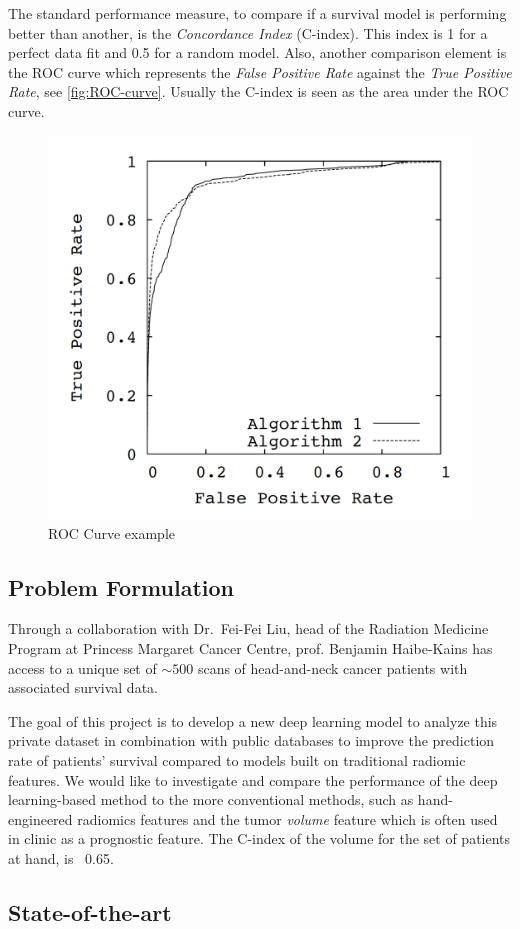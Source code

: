 The standard performance measure, to compare if a survival 
model is performing better than another, is the \emph{Concordance Index} (C-index). This 
index is 1 for a perfect data fit and 0.5 for a random model. Also, another comparison 
element is the ROC curve which represents the \emph{False Positive Rate} against the 
\emph{True Positive Rate}, see \autoref{fig:ROC-curve}. Usually the C-index is seen as 
the area under the ROC curve.
~\cites{neural:ROC-precision-recall}{medical:RankingCI}

\begin{figure}
  \centering
  \includegraphics[width=.5\linewidth]{images/roc_curve}
  \caption{ROC Curve example\label{fig:ROC-curve}}
\end{figure}

\subsection{Problem Formulation}

Through a collaboration with Dr.~Fei-Fei Liu, head of the Radiation Medicine Program at Princess
Margaret Cancer Centre, prof. Benjamin Haibe-Kains has access to a unique set of \( {\sim}500 \) 
scans of head-and-neck cancer patients with associated survival data. 

The goal of this project is to develop a new deep learning model to analyze this private 
dataset in combination with public databases to improve the prediction rate of patients' 
survival compared to models built on traditional radiomic features. We would like to 
investigate and compare the performance of the deep learning-based method 
to the more conventional methods, such as hand-engineered radiomics features and the tumor 
\emph{volume} feature which is often used in clinic as a prognostic feature. The C-index 
of the volume for the set of patients at hand, is ~0.65.

\subsection{State-of-the-art}

